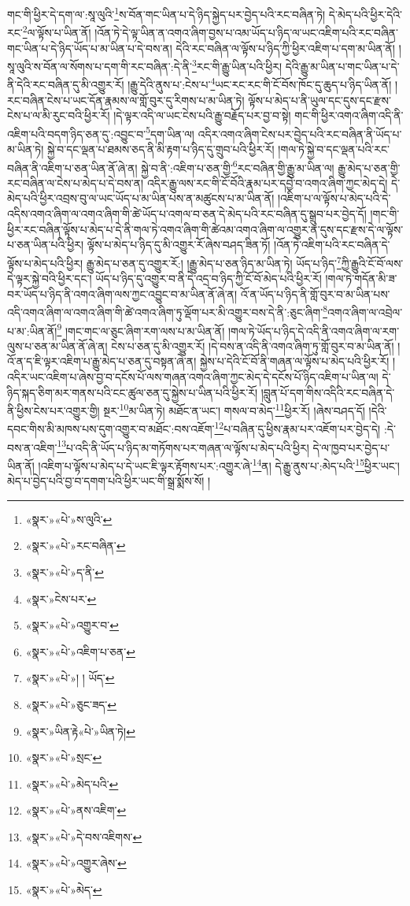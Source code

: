 གང་གི་ཕྱིར་དེ་དག་ལ་:སཱ་ལུའི་\footnote{«སྣར་»«པེ་»ས་ལུའི་}ས་བོན་གང་ཡིན་པ་དེ་ཉིད་སྐྱེད་པར་བྱེད་པའི་རང་བཞིན་ཏེ། དེ་མེད་པའི་ཕྱིར་དེའི་རང་\footnote{«སྣར་»«པེ་»རང་བཞིན་}ལ་ལྟོས་པ་ཡིན་ནོ། །འོན་ཏེ་དེ་ལྟ་ཡིན་ན་འགའ་ཞིག་བྱས་པ་འམ་ཡོད་པ་ཉིད་ལ་ཡང་འཇིག་པའི་རང་བཞིན་གང་ཡིན་པ་དེ་ཉིད་ཡོད་པ་མ་ཡིན་པ་དེ་བས་ན། དེའི་རང་བཞིན་ལ་ལྟོས་པ་ཉིད་ཀྱི་ཕྱིར་འཇིག་པ་དག་མ་ཡིན་ནོ། །སཱ་ལུའི་ས་བོན་ལ་སོགས་པ་དག་གི་རང་བཞིན་:དེ་ནི་\footnote{«སྣར་»«པེ་»ད་ནི་}རང་གི་རྒྱུ་ཡིན་པའི་ཕྱིར། དེའི་རྒྱུ་མ་ཡིན་པ་གང་ཡིན་པ་དེ་ནི་དེའི་རང་བཞིན་དུ་མི་འགྱུར་རོ། །རྒྱུ་དེའི་ནུས་པ་:ངེས་པ་\footnote{«སྣར་»ངེས་པར་}ཡང་རང་རང་གི་ངོ་བོས་ཁོང་དུ་ཆུད་པ་ཉིད་ཡིན་ནོ། །རང་བཞིན་ངེས་པ་ཡང་དོན་རྣམས་ལ་གློ་བུར་དུ་རིགས་པ་མ་ཡིན་ཏེ། ལྟོས་པ་མེད་པ་ནི་ཡུལ་དང་དུས་དང་རྫས་ངེས་པ་ལ་མི་རུང་བའི་ཕྱིར་རོ། །དེ་ལྟར་འདི་ལ་ཡང་ངེས་པའི་རྒྱུ་བརྗོད་པར་བྱ་བ་སྟེ། གང་གི་ཕྱིར་འགའ་ཞིག་འདི་ནི་འཇིག་པའི་བདག་ཉིད་ཅན་དུ་:འབྱུང་བ་\footnote{«སྣར་»«པེ་»འགྱུར་བ་}དག་ཡིན་ལ། འདིར་འགའ་ཞིག་ངེས་པར་བྱེད་པའི་རང་བཞིན་ནི་ཡོད་པ་མ་ཡིན་ཏེ། སྐྱེ་བ་དང་ལྡན་པ་ཐམས་ཅད་ནི་མི་རྟག་པ་ཉིད་དུ་གྲུབ་པའི་ཕྱིར་རོ། །གལ་ཏེ་སྐྱེ་བ་དང་ལྡན་པའི་རང་བཞིན་ནི་འཇིག་པ་ཅན་ཡིན་ནོ་ཞེ་ན། སྐྱེ་བ་ནི་:འཇིག་པ་ཅན་གྱི་\footnote{«སྣར་»«པེ་»འཇིག་པ་ཅན་}རང་བཞིན་གྱི་རྒྱུ་མ་ཡིན་ལ། རྒྱུ་མེད་པ་ཅན་གྱི་རང་བཞིན་ལ་ངེས་པ་མེད་པ་དེ་བས་ན། འདིར་རྒྱུ་ལས་རང་གི་ངོ་བོའི་རྣམ་པར་དབྱེ་བ་འགའ་ཞིག་ཀྱང་མེད་དེ། དེ་མེད་པའི་ཕྱིར་འབྲས་བུ་ལ་ཡང་ཡོད་པ་མ་ཡིན་པས་ན་མཚུངས་པ་མ་ཡིན་ནོ། །འཇིག་པ་ལ་ལྟོས་པ་མེད་པའི་དེ་འདིས་འགའ་ཞིག་ལ་འགའ་ཞིག་གི་ཚེ་ཡོད་པ་འགལ་བ་ཅན་དེ་མེད་པའི་རང་བཞིན་དུ་སྒྲུབ་པར་བྱེད་དོ། །གང་གི་ཕྱིར་རང་བཞིན་ལྟོས་པ་མེད་པ་དེ་ནི་གལ་ཏེ་འགའ་ཞིག་གི་ཚེའམ་འགའ་ཞིག་ལ་འགྱུར་ན་དུས་དང་རྫས་དེ་ལ་ལྟོས་པ་ཅན་ཡིན་པའི་ཕྱིར། ལྟོས་པ་མེད་པ་ཉིད་དུ་མི་འགྱུར་རོ་ཞེས་བཤད་ཟིན་ཏོ། །འོན་ཏེ་འཇིག་པའི་རང་བཞིན་དེ་ལྟོས་པ་མེད་པའི་ཕྱིར། རྒྱུ་མེད་པ་ཅན་དུ་འགྱུར་རོ:། །རྒྱུ་མེད་པ་ཅན་ཉིད་མ་ཡིན་ཏེ། ཡོད་པ་ཉིད་\footnote{«སྣར་»«པེ་»། ། ཡོད་}ཀྱི་རྒྱུའི་ངོ་བོ་ལས་དེ་ལྟར་སྐྱེ་བའི་ཕྱིར་དང་། ཡོད་པ་ཉིད་དུ་འགྱུར་བ་ནི་དེ་འདྲ་བ་ཉིད་ཀྱི་ངོ་བོ་མེད་པའི་ཕྱིར་རོ། །གལ་ཏེ་གདོན་མི་ཟ་བར་ཡོད་པ་ཉིད་ནི་འགའ་ཞིག་ལས་ཀྱང་འབྱུང་བ་མ་ཡིན་ནོ་ཞེ་ན། འོ་ན་ཡོད་པ་ཉིད་ནི་གློ་བུར་བ་མ་ཡིན་པས་འདི་འགའ་ཞིག་ལ་འགའ་ཞིག་གི་ཚེ་འགའ་ཞིག་ཏུ་ལྡོག་པར་མི་འགྱུར་བས་དེ་ནི་:ཅུང་ཞིག་\footnote{«སྣར་»«པེ་»ཅུང་ཟད་}འགའ་ཞིག་ལ་འབྲེལ་པ་མ་:ཡིན་ནོ།\footnote{«སྣར་»ཡིན་རྟེ«པེ་»ཡིན་ཏེ།} །གང་གང་ལ་ཅུང་ཞིག་རག་ལས་པ་མ་ཡིན་ནོ། །གལ་ཏེ་ཡོད་པ་ཉིད་དེ་འདི་ནི་འགའ་ཞིག་ལ་རག་ལུས་པ་ཅན་མ་ཡིན་ནོ་ཞེ་ན། ངེས་པ་ཅན་དུ་མི་འགྱུར་རོ། །དེ་བས་ན་འདི་ནི་འགའ་ཞིག་ཏུ་གློ་བུར་བ་མ་ཡིན་ནོ། །འོ་ན་ད་ཇི་ལྟར་འཇིག་པ་རྒྱུ་མེད་པ་ཅན་དུ་བསྟན་ཞེ་ན། སྐྱེས་པ་དེའི་ངོ་བོ་ནི་གཞན་ལ་ལྟོས་པ་མེད་པའི་ཕྱིར་རོ། །འདིར་ཡང་འཇིག་པ་ཞེས་བྱ་བ་དངོས་པོ་ལས་གཞན་འགའ་ཞིག་ཀྱང་མེད་དེ་དངོས་པོ་ཉིད་འཇིག་པ་ཡིན་ལ། དེ་ཉིད་སྐད་ཅིག་མར་གནས་པའི་ངང་ཚུལ་ཅན་དུ་སྐྱེས་པ་ཡིན་པའི་ཕྱིར་རོ། །བླུན་པོ་དག་གིས་འདིའི་རང་བཞིན་དེ་ནི་ཕྱིས་ངེས་པར་འགྱུར་གྱི། སྔར་\footnote{«སྣར་»«པེ་»སྲང་}མ་ཡིན་ཏེ། མཐོང་ན་ཡང་། གསལ་བ་མེད་\footnote{«སྣར་»«པེ་»མེད་པའི་}ཕྱིར་རོ། །ཞེས་བཤད་དོ། །དེའི་དབང་གིས་མི་མཁས་པས་དུག་འགྱུར་བ་མཐོང་:བས་འཇོག་\footnote{«སྣར་»«པེ་»ནས་འཇིག་}པ་བཞིན་དུ་ཕྱིས་རྣམ་པར་འཇོག་པར་བྱེད་དེ། :དེ་བས་ན་འཇིག་\footnote{«སྣར་»«པེ་»དེ་བས་འཇིགས་}པ་འདི་ནི་ཡོད་པ་ཉིད་མ་གཏོགས་པར་གཞན་ལ་ལྟོས་པ་མེད་པའི་ཕྱིར། དེ་ལ་ཁྱབ་པར་བྱེད་པ་ཡིན་ནོ། །འཇིག་པ་ལྟོས་པ་མེད་པ་དེ་ཡང་ཇི་ལྟར་རྟོགས་པར་:འགྱུར་ཞེ་\footnote{«སྣར་»«པེ་»འགྱུར་ཞེས་}ན། དེ་རྒྱུ་ནུས་པ་:མེད་པའི་\footnote{«སྣར་»«པེ་»མེད་}ཕྱིར་ཡང་། མེད་པ་བྱེད་པའི་བྱ་བ་དགག་པའི་ཕྱིར་ཡང་གི་སྒྲ་སྨོས་སོ། །
